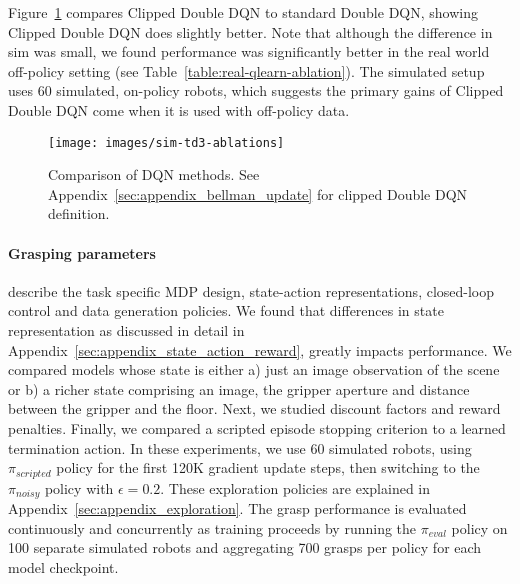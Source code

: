 \documentclass{article}
\begin{document}
Figure~\ref{fig:sim-dqn-graphs} compares Clipped Double DQN to standard Double DQN, showing Clipped Double DQN does slightly better. Note that although the difference in sim was small, we found performance was significantly better in the real world off-policy setting (see Table~\ref{table:real-qlearn-ablation}). The simulated setup uses 60 simulated, on-policy robots, which suggests the primary gains of Clipped Double DQN come when it is used with off-policy data.

\begin{figure}[h]
\centering
 \texttt{[image: images/sim-td3-ablations]}
   \caption{Comparison of DQN methods. See Appendix~\ref{sec:appendix_bellman_update} for clipped Double DQN definition.}
\label{fig:sim-dqn-graphs}
\vspace{-0.1in}
\end{figure}\paragraph{Grasping parameters} describe the task specific MDP design, \ie state-action representations, closed-loop control and data generation policies. We found that differences in state representation as discussed in detail in Appendix~\ref{sec:appendix_state_action_reward}, greatly impacts performance. We compared models whose state is either a) just an image observation of the scene or b) a richer state comprising an image, the gripper aperture and distance between the gripper and the floor. Next, we studied discount factors and reward penalties. Finally, we compared a scripted episode stopping criterion to a learned termination action. In these experiments, we use 60 simulated robots, using \(\pi_{scripted}\) policy for the first 120K gradient update steps, then switching to the \(\pi_{noisy}\) policy with \(\epsilon=0.2\). These exploration policies are explained in Appendix~\ref{sec:appendix_exploration}. The grasp performance is evaluated continuously and concurrently as training proceeds by running the \(\pi_{eval}\) policy on 100 separate simulated robots and aggregating 700 grasps per policy for each model checkpoint.
\end{document}
